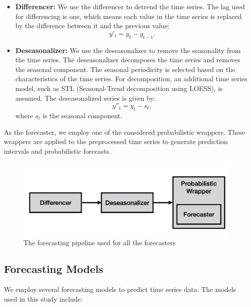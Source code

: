 \begin{itemize}
    \item \textbf{Differencer:} We use the differencer to detrend the time series. The lag used for differencing is one, which means each value in the time series is replaced by the difference between it and the previous value:
    \begin{equation}
        y'_t = y_t - y_{t-1}.
    \end{equation}
    \item \textbf{Deseasonalizer:} We use the deseasonalizer to remove the seasonality from the time series. The deseasonalizer decomposes the time series and removes the seasonal component. The seasonal periodicity is selected based on the characteristics of the time series. For decomposition, an additional time series model, such as STL (Seasonal-Trend decomposition using LOESS), is assumed. The deseasonalized series is given by:
    \begin{equation}
        y''_t = y_t - s_t,
    \end{equation}
    where \( s_t \) is the seasonal component.
\end{itemize}

As the forecaster, we employ one of the considered probabilistic wrappers. These wrappers are applied to the preprocessed time series to generate prediction intervals and probabilistic forecasts.

\begin{figure}
    \centering
    \includegraphics[width=\textwidth]{Figures/Pipeline.png}
    \caption{The forecasting pipeline used for all the forecasters}
    \label{fig:pipeline}
\end{figure}

\subsection{Forecasting Models}
We employ several forecasting models to predict time series data. The models used in this study include:


